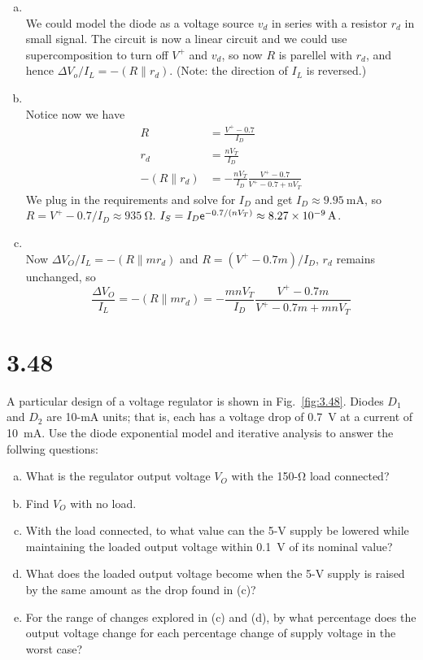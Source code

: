 \documentclass[12pt, a4paper]{article}
\begin{document}
\begin{enumerate}[(a)]
  \item \Ans \\
    We could model the diode as a voltage source $v_d$ in series with
    a resistor $r_d$ in small signal. The circuit is now a linear circuit
    and we could use supercomposition to turn off $V^+$ and $v_d$, so now
    $R$ is parellel with $r_d$, and hence 
    $\Delta V_o / I_L = -(R \parallel r_d)$.
    (Note: the direction of $I_L$ is reversed.)
  \item \Ans \\
    Notice now we have
    \begin{align*}
      R &= \frac{V^+ - 0.7}{I_D} \\
      r_d &= \frac{nV_T}{I_D} \\
      -(R \parallel r_d) &= -\frac{nV_T}{I_D} \frac{V^+ - 0.7}{V^+ - 0.7 + nV_T }
    \end{align*}
    We plug in the requirements and solve for $I_D$ and get
    $I_D \approx \SI{9.95}\mA$, so $R = V^+ - 0.7 / I_D \approx \SI{935}\ohm$.
    $I_S = I_D \ex^{-0.7/(nV_T)} \approx \SI{8.27e-9}\A$.
  \item \Ans \\
    Now $\Delta V_O / I_L = -(R \parallel m r_d)$ and
    $R = (V^+ - 0.7m) / I_D$, $r_d$ remains unchanged, so 
    \[
      \frac{\Delta V_O}{I_L} = -(R \parallel m r_d) =
      -\frac{mnV_T}{I_D} \frac{V^+ - 0.7m}{V^+ - 0.7m + mnV_T }
    \]
\end{enumerate}

\section{3.48}
A particular design of a voltage regulator is shown in Fig.~\ref{fig:3.48}.
Diodes $D_1$ and $D_2$ are 10-\si{\mA} units; that is,
each has a voltage drop of \SI{0.7}{\V} at a current of
\SI{10}{\mA}. Use the diode exponential model and iterative
analysis to answer the follwing questions:
\begin{enumerate}[(a)]
  \item What is the regulator output voltage $V_O$ with the
    150-\si{\ohm} load connected?
  \item Find $V_O$ with no load.
  \item With the load connected, to what value can the 5-\si{\V}
    supply be lowered while maintaining the loaded output voltage
    within \SI{0.1}{\V} of its nominal value?
  \item What does the loaded output voltage become when the 5-\si{\V}
    supply is raised by the same amount as the drop found in (c)?
  \item For the range of changes explored in (c) and (d), by what
    percentage does the output voltage change for each percentage
    change of supply voltage in the worst case?
\end{enumerate}
\end{document}
